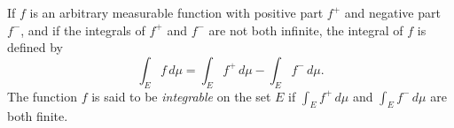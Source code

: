 If $f$ is an arbitrary measurable function with positive part $f^+$ and negative part $f^-$, and if the integrals of $f^+$ and $f^-$ are not both infinite, the integral of $f$ is defined by
$$\int_E f \, d\mu = \int_E f^+ \, d\mu - \int_E f^- \, d\mu.$$
The function $f$ is said to be \textit{integrable} on the set $E$ if $\int_E f^+ \, d\mu$ and $\int_E f^- \, d\mu$ are both finite.
